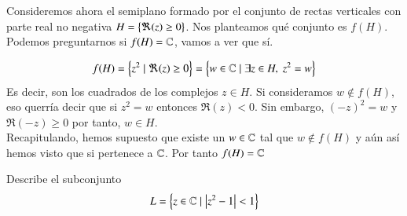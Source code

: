     Consideremos ahora el semiplano formado por el conjunto de rectas verticales con parte real no negativa $H = \left\{\Re(z) \geq 0\right\}$. Nos planteamos qué conjunto es $f(H)$. Podemos preguntarnos si $f(H) = \mathbb{C}$, vamos a ver que sí.

    $$
        f(H) = \left\{z^2 \mid \Re(z) \geq 0\right\} = \left\{w \in \mathbb{C} \mid \exists z \in H,\ z^2 = w\right\}
    $$
    Es decir, son los cuadrados de los complejos $z \in H$. Si consideramos $w \notin f(H)$, eso querría decir que si $z^2 = w$ entonces $\Re(z) < 0$. Sin embargo, $(-z)^2 = w$ y $\Re(-z) \geq 0$ por tanto, $w \in H$.\\
    Recapitulando, hemos supuesto que existe un $w \in \mathbb{C}$ tal que $w \notin f(H)$ y aún así hemos visto que si pertenece a $\mathbb{C}$. Por tanto $f(H) = \mathbb{C}$

    \begin{th_ex}
        Describe el subconjunto
        $$
            L = \left\{z \in \mathbb{C} \mid \left|z^2-1\right| < 1\right\}
        $$
    \end{th_ex}

